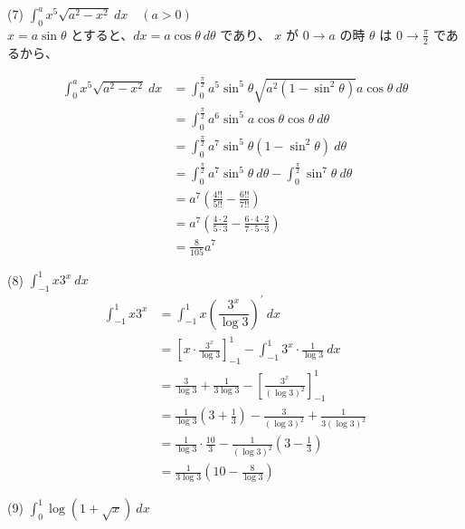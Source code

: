 \documentclass[a4j]{jsarticle}
\begin{document}
    (7) $\displaystyle \int_{0}^{a} x^5 \sqrt{a^2 - x^2} \: dx \quad (a > 0) $ \\

    $x = a \sin \theta$ とすると、$dx = a \cos \theta \: d\theta$ であり、
    $\displaystyle x$ が $0 \rightarrow a$ の時 $\theta$ は $\displaystyle 0 \rightarrow \frac{\pi}{2}$ であるから、

    \begin{align*}
        \int_{0}^{a} x^5 \sqrt{a^2 - x^2} \: dx &= \int_{0}^{\frac{\pi}{2}} a^5 \sin^5 \theta \sqrt{a^2\left(1 - \sin^2 \theta\right)} a \cos \theta \: d\theta \\
        &= \int_{0}^{\frac{\pi}{2}} a^6 \sin^5 a \cos \theta \cos \theta \: d \theta \\
        &= \int_{0}^{\frac{\pi}{2}} a^7 \sin^5 \theta \left(1 - \sin^2 \theta\right) \: d \theta \\
        &= \int_{0}^{\frac{\pi}{2}} a^7 \sin^5 \theta \: d\theta - \int_{0}^{\frac{\pi}{2}} \sin^7 \theta \: d\theta \\
        &= a^7 \left(\frac{4!!}{5!!} - \frac{6!!}{7!!}\right) \\
        &= a^7 \left(\frac{4 \cdot 2}{5 \cdot 3} - \frac{6 \cdot 4 \cdot 2}{7 \cdot 5 \cdot 3}\right) \\
        &= \frac{8}{105}a^7
    \end{align*}

    (8) $\displaystyle \int_{-1}^{1} x3^x \: dx $ \\

    \begin{align*}
        \int_{-1}^{1} x3^x &= \int_{-1}^{1} x \left(\dfrac{3^x}{\log 3}\right)^{\prime} \: dx \\
        &= \left[x \cdot \frac{3^x}{\log 3}\right]_{-1}^{1} - \int_{-1}^{1} 3^x \cdot \frac{1}{\log 3} \: dx \\
        &= \frac{3}{\log 3} + \frac{1}{3 \log 3} - \left[\frac{3^x}{(\log 3)^2}\right]_{-1}^{1} \\
        &= \frac{1}{\log 3} \left(3 + \frac{1}{3}\right) - \frac{3}{(\log 3)^2} + \frac{1}{3(\log 3)^2} \\
        &= \frac{1}{\log 3} \cdot \frac{10}{3} - \frac{1}{(\log 3)^2} \left(3 - \frac{1}{3}\right) \\
        &= \frac{1}{3 \log 3} \left(10 - \frac{8}{\log 3}\right)
    \end{align*}

    (9) $\displaystyle \int_{0}^{1} \log(1 + \sqrt{x}) \: dx $ \\
\end{document}
